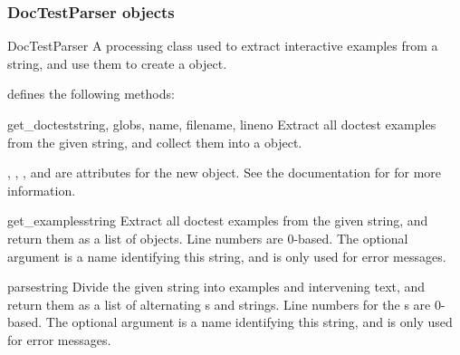 \subsubsection{DocTestParser objects\label{doctest-DocTestParser}}
\begin{classdesc}{DocTestParser}{}
    A processing class used to extract interactive examples from a
    string, and use them to create a  object.
\end{classdesc}

 defines the following methods:

\begin{methoddesc}{get_doctest}{string, globs, name, filename, lineno}
    Extract all doctest examples from the given string, and collect
    them into a  object.

    , , , and  are
    attributes for the new  object.  See the
    documentation for  for more information.
\end{methoddesc}

\begin{methoddesc}{get_examples}{string}
    Extract all doctest examples from the given string, and return
    them as a list of  objects.  Line numbers are
    0-based.  The optional argument  is a name identifying
    this string, and is only used for error messages.
\end{methoddesc}

\begin{methoddesc}{parse}{string}
    Divide the given string into examples and intervening text, and
    return them as a list of alternating s and strings.
    Line numbers for the s are 0-based.  The optional
    argument  is a name identifying this string, and is only
    used for error messages.
\end{methoddesc}

